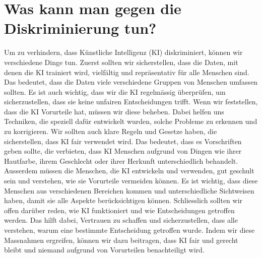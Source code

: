 \documentclass{article}
\begin{document}
\section{Was kann man gegen die Diskriminierung tun?}
Um zu verhindern, dass Künstliche Intelligenz (KI) diskriminiert, können wir verschiedene Dinge tun. Zuerst sollten wir sicherstellen, dass die Daten, mit denen die KI trainiert wird, vielfältig und repräsentativ für alle Menschen sind. Das bedeutet, dass die Daten viele verschiedene Gruppen von Menschen umfassen sollten. Es ist auch wichtig, dass wir die KI regelmässig überprüfen, um sicherzustellen, dass sie keine unfairen Entscheidungen trifft. Wenn wir feststellen, dass die KI Vorurteile hat, müssen wir diese beheben. Dabei helfen uns Techniken, die speziell dafür entwickelt wurden, solche Probleme zu erkennen und zu korrigieren. Wir sollten auch klare Regeln und Gesetze haben, die sicherstellen, dass KI fair verwendet wird. Das bedeutet, dass es Vorschriften geben sollte, die verbieten, dass KI Menschen aufgrund von Dingen wie ihrer Hautfarbe, ihrem Geschlecht oder ihrer Herkunft unterschiedlich behandelt. Ausserdem müssen die Menschen, die KI entwickeln und verwenden, gut geschult sein und verstehen, wie sie Vorurteile vermeiden können. Es ist wichtig, dass diese Menschen aus verschiedenen Bereichen kommen und unterschiedliche Sichtweisen haben, damit sie alle Aspekte berücksichtigen können. Schliesslich sollten wir offen darüber reden, wie KI funktioniert und wie Entscheidungen getroffen werden. Das hilft dabei, Vertrauen zu schaffen und sicherzustellen, dass alle verstehen, warum eine bestimmte Entscheidung getroffen wurde. Indem wir diese Massnahmen ergreifen, können wir dazu beitragen, dass KI fair und gerecht bleibt und niemand aufgrund von Vorurteilen benachteiligt wird.
\end{document}
